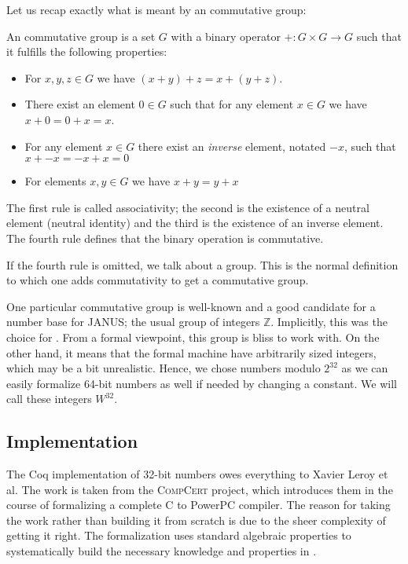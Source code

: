Let us recap exactly what is meant by an commutative group:
\begin{defn}
  An commutative group is a set $G$ with a binary operator $+\colon G
  \times G \to G$ such that it fulfills the following properties:
  \begin{itemize}
  \item For $x,y,z \in G$ we have $(x + y) + z = x + (y + z)$.
  \item There exist an element $0 \in G$ such that for any element $x
    \in G$ we have $x + 0 = 0 + x = x$.
  \item For any element $x \in G$ there exist an \emph{inverse}
    element, notated $-x$, such that $x + -x = -x + x = 0$
  \item For elements $x, y \in G$ we have $x + y = y + x$
  \end{itemize}
  The first rule is called associativity; the second is the existence
  of a neutral element (neutral identity) and the third is the
  existence of an inverse element. The fourth rule defines that the
  binary operation is commutative.

  If the fourth rule is omitted, we talk about a group. This is the
  normal definition to which one adds commutativity to get a
  commutative group.
\end{defn}

One particular commutative group is well-known and a good candidate
for a number base for JANUS; the usual group of integers
$\mathbb{Z}$. Implicitly, this was the choice for \janusz{}. From a
formal viewpoint, this group is bliss to work with. On the other hand,
it means that the formal machine have arbitrarily sized integers,
which may be a bit unrealistic. Hence, we chose numbers modulo
$2^{32}$ as we can easily formalize 64-bit numbers as well if needed
by changing a constant. We will call these integers $W^{32}$.

\subsection{\coq{} Implementation}

The Coq implementation of 32-bit numbers owes everything to Xavier
Leroy et al\cite{Leroy-Compcert-Coq}. The work is taken from the
\textsc{CompCert} project, which introduces them in the course of
formalizing a complete C to PowerPC compiler. The reason for taking
the work rather than building it from scratch is due to the sheer
complexity of getting it right. The formalization uses standard
algebraic properties to systematically build the necessary knowledge
and properties in \coq{}.

